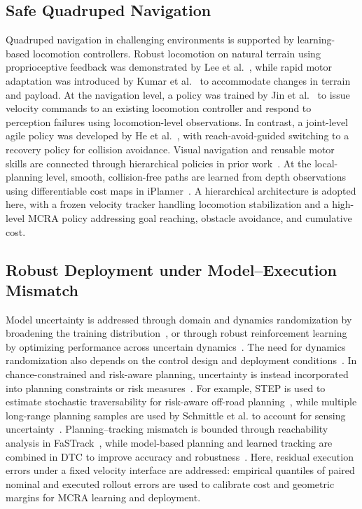\documentclass[conference]{IEEEtran}
\begin{document}
\subsection{Safe Quadruped Navigation}
Quadruped navigation in challenging environments is supported by
learning-based locomotion controllers. Robust locomotion on natural terrain
using proprioceptive feedback was demonstrated by Lee et al.~\cite{lee2020},
while rapid motor adaptation was introduced by Kumar et al.~\cite{kumar2021}
to accommodate changes in terrain and payload. At the navigation level, a policy
was trained by Jin et al.~\cite{jin2023resilient} to issue velocity commands to an
existing locomotion controller and respond to perception failures using
locomotion-level observations. In contrast, a joint-level agile policy was
developed by He et al.~\cite{he2024abs}, with reach-avoid-guided switching to a
recovery policy for collision avoidance. Visual navigation and reusable motor
skills are connected through hierarchical policies in prior
work~\cite{jain2021pixels,hoeller2024}. At the local-planning level, smooth,
collision-free paths are learned from depth observations using differentiable
cost maps in iPlanner~\cite{yang2023iplanner}. A
hierarchical architecture is adopted here, with a frozen velocity tracker handling
locomotion stabilization and a high-level MCRA policy addressing goal reaching,
obstacle avoidance, and cumulative cost.

\subsection{Robust Deployment under Model--Execution Mismatch}
Model uncertainty is addressed through domain and dynamics randomization by
broadening the training distribution~\cite{tobin2017,tan2018simreal},
or through robust reinforcement learning by optimizing performance across uncertain
dynamics~\cite{smirnova2019,wang2021,liu2022drql}. The need for dynamics randomization
also depends on the control design and deployment conditions~\cite{xie2021randomization}.
In chance-constrained and risk-aware planning, uncertainty is instead incorporated
into planning constraints or risk measures~\cite{theurkauf2023,fan2021step,schmittle2024}. For example, STEP
is used to estimate stochastic traversability for risk-aware off-road
planning~\cite{fan2021step}, while multiple long-range planning samples are used by Schmittle et al.
to account for sensing uncertainty~\cite{schmittle2024}.
Planning--tracking mismatch is bounded through reachability analysis in
FaSTrack~\cite{herbert2017fastrack}, while model-based planning and learned tracking
are combined in DTC to improve accuracy and robustness~\cite{jenelten2024dtc}.
Here, residual execution errors under a fixed velocity interface are addressed:
empirical quantiles of paired nominal and executed rollout errors are
used to calibrate cost and geometric margins for MCRA learning and deployment.
\end{document}
